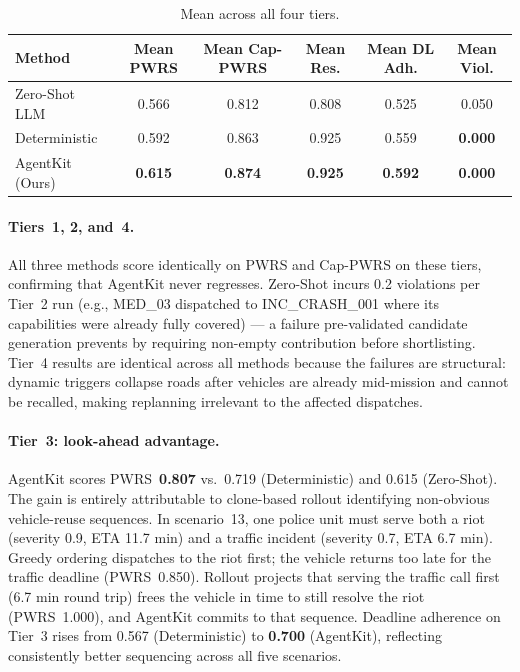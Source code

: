 \documentclass{article}
\begin{document}
\begin{table}[t]
\centering
\caption{Mean across all four tiers.}
\label{tab:summary}
\small
\renewcommand{\arraystretch}{1.05}
\begin{tabular}{lccccc}
\toprule
\textbf{Method} & \textbf{Mean PWRS} & \textbf{Mean Cap-PWRS} &
  \textbf{Mean Res.} & \textbf{Mean DL Adh.} & \textbf{Mean Viol.} \\
\midrule
Zero-Shot LLM   & 0.566 & 0.812 & 0.808 & 0.525 & 0.050 \\
Deterministic   & 0.592 & 0.863 & 0.925 & 0.559 & \textbf{0.000} \\
AgentKit (Ours) & \textbf{0.615} & \textbf{0.874} & \textbf{0.925} & \textbf{0.592} & \textbf{0.000} \\
\bottomrule
\end{tabular}
\end{table}

\paragraph{Tiers~1, 2, and~4.}
All three methods score identically on PWRS and Cap-PWRS on these tiers,
confirming that AgentKit never regresses.
Zero-Shot incurs 0.2 violations per Tier~2 run (e.g., MED\_03 dispatched
to INC\_CRASH\_001 where its capabilities were already fully covered) ---
a failure pre-validated candidate generation prevents by requiring
non-empty contribution before shortlisting.
Tier~4 results are identical across all methods because the failures are
structural: dynamic triggers collapse roads after vehicles are already
mid-mission and cannot be recalled, making replanning irrelevant to the
affected dispatches.

\paragraph{Tier~3: look-ahead advantage.}
AgentKit scores PWRS~\textbf{0.807} vs.\ 0.719 (Deterministic) and 0.615
(Zero-Shot).
The gain is entirely attributable to clone-based rollout identifying
non-obvious vehicle-reuse sequences.
In scenario~13, one police unit must serve both a riot (severity 0.9,
ETA 11.7 min) and a traffic incident (severity 0.7, ETA 6.7 min).
Greedy ordering dispatches to the riot first; the vehicle returns too
late for the traffic deadline (PWRS~0.850).
Rollout projects that serving the traffic call first (6.7 min round trip)
frees the vehicle in time to still resolve the riot (PWRS~1.000), and
AgentKit commits to that sequence.
Deadline adherence on Tier~3 rises from 0.567 (Deterministic) to
\textbf{0.700} (AgentKit), reflecting consistently better sequencing
across all five scenarios.
\end{document}
